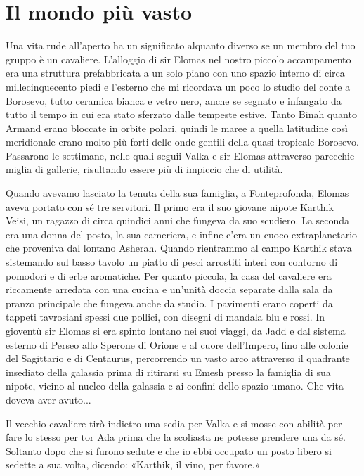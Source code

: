 \chapter{Il mondo più vasto}

Una vita rude all'aperto ha un significato alquanto diverso se un membro
del tuo gruppo è un cavaliere. L'alloggio di sir Elomas nel nostro
piccolo accampamento era una struttura prefabbricata a un solo piano con
uno spazio interno di circa millecinquecento piedi e l'esterno che mi
ricordava un poco lo studio del conte a Borosevo, tutto ceramica bianca
e vetro nero, anche se segnato e infangato da tutto il tempo in cui era
stato sferzato dalle tempeste estive. Tanto Binah quanto Armand erano
bloccate in orbite polari, quindi le maree a quella latitudine così
meridionale erano molto più forti delle onde gentili della quasi
tropicale Borosevo. Passarono le settimane, nelle quali seguii Valka e
sir Elomas attraverso parecchie miglia di gallerie, risultando essere
più di impiccio che di utilità.

Quando avevamo lasciato la tenuta della sua famiglia, a Fonteprofonda,
Elomas aveva portato con sé tre servitori. Il primo era il suo giovane
nipote Karthik Veisi, un ragazzo di circa quindici anni che fungeva da
suo scudiero. La seconda era una donna del posto, la sua cameriera, e
infine c'era un cuoco extraplanetario che proveniva dal lontano Asherah.
Quando rientrammo al campo Karthik stava sistemando sul basso tavolo un
piatto di pesci arrostiti interi con contorno di pomodori e di erbe
aromatiche. Per quanto piccola, la casa del cavaliere era riccamente
arredata con una cucina e un'unità doccia separate dalla sala da pranzo
principale che fungeva anche da studio. I pavimenti erano coperti da
tappeti tavrosiani spessi due pollici, con disegni di mandala blu e
rossi. In gioventù sir Elomas si era spinto lontano nei suoi viaggi, da
Jadd e dal sistema esterno di Perseo allo Sperone di Orione e al cuore
dell'Impero, fino alle colonie del Sagittario e di Centaurus,
percorrendo un vasto arco attraverso il quadrante insediato della
galassia prima di ritirarsi su Emesh presso la famiglia di sua nipote,
vicino al nucleo della galassia e ai confini dello spazio umano. Che
vita doveva aver avuto...

Il vecchio cavaliere tirò indietro una sedia per Valka e si mosse con
abilità per fare lo stesso per tor Ada prima che la scoliasta ne potesse
prendere una da sé. Soltanto dopo che si furono sedute e che io ebbi
occupato un posto libero si sedette a sua volta, dicendo: «Karthik, il
vino, per favore.»

